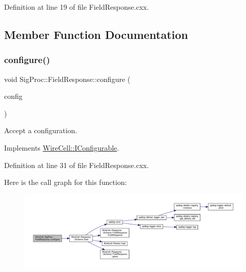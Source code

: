 Definition at line 19 of file Field\+Response.\+cxx.



\subsection{Member Function Documentation}
\mbox{\label{class_wire_cell_1_1_sig_proc_1_1_field_response_aebaaef66bd121652084b5eb2e68cabfa}} 
\subsubsection{\texorpdfstring{configure()}{configure()}}
{\footnotesize\ttfamily void Sig\+Proc\+::\+Field\+Response\+::configure (\begin{DoxyParamCaption}\item[{const \hyperlink{namespace_wire_cell_a9f705541fc1d46c608b3d32c182333ee}{Wire\+Cell\+::\+Configuration} \&}]{config }\end{DoxyParamCaption})\hspace{0.3cm}{\ttfamily [virtual]}}



Accept a configuration. 



Implements \hyperlink{class_wire_cell_1_1_i_configurable_a57ff687923a724093df3de59c6ff237d}{Wire\+Cell\+::\+I\+Configurable}.



Definition at line 31 of file Field\+Response.\+cxx.

Here is the call graph for this function\+:
\nopagebreak
\begin{figure}[H]
\begin{center}
\leavevmode
\includegraphics[width=350pt]{class_wire_cell_1_1_sig_proc_1_1_field_response_aebaaef66bd121652084b5eb2e68cabfa_cgraph}
\end{center}
\end{figure}
\mbox{\label{class_wire_cell_1_1_sig_proc_1_1_field_response_a0ee90ff076a2aba11ac0598220e8bc09}} 
